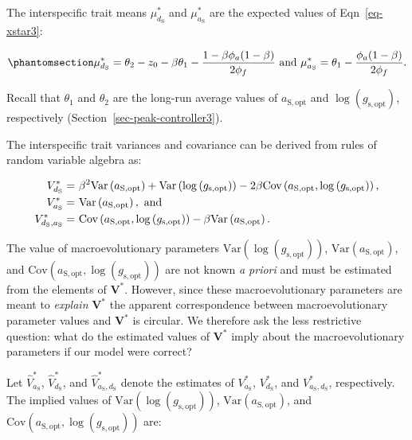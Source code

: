 \documentclass[
  letterpaper,
  DIV=11,
  numbers=noendperiod]{scrartcl}
\begin{document}
The interspecific trait means \(\mu_{d_{\mathrm{S}}}^*\) and
\(\mu_{a_{\mathrm{S}}}^*\) are the expected values of
Eqn~\ref{eq-xstar3}:

\begin{equation}\phantomsection\label{eq-mustar3}{\mu_{d_\mathrm{S}}^* = \theta_2 - z_0 - \beta \theta_1 - \frac{1 - \beta \phi_a (1 - \beta)}{2 \phi_f} ~\text{and}~\mu_{a_\mathrm{S}}^* = \theta_1 - \frac{\phi_a ( 1 - \beta)}{2 \phi_f}.}\end{equation}

Recall that \(\theta_1\) and \(\theta_2\) are the long-run average
values of \(a_\mathrm{S,opt}\) and
\(\log \left( g_\mathrm{s,opt} \right)\), respectively
(Section~\ref{sec-peak-controller3}).

The interspecific trait variances and covariance can be derived from
rules of random variable algebra as:

\begin{align}
\label{eq:Vstar3}
  V_{d_\mathrm{S}}^* =~& \beta ^2 \text{Var} \left( a_\mathrm{S,opt} \right) + \text{Var} \left(\log \left( g_\mathrm{s,opt} \right) \right) - 2 \beta \text{Cov} \left(a_\mathrm{S,opt}, \log \left(g_\mathrm{s,opt} \right) \right), \notag \\
  V_{a_\mathrm{S}}^* =~& \text{Var} \left( a_\mathrm{S,opt} \right),~\text{and} \notag \\
  V_{d_\mathrm{S},a_\mathrm{S}}^* =~& \text{Cov} \left(a_\mathrm{S,opt}, \log \left(g_\mathrm{s,opt} \right) \right) - \beta \text{Var} \left( a_\mathrm{S,opt} \right).
\end{align}

The value of macroevolutionary parameters
\(\text{Var} \left(\log \left( g_\mathrm{s,opt} \right) \right)\),
\(\text{Var} \left( a_\mathrm{S,opt} \right)\), and
\(\text{Cov} \left(a_\mathrm{S,opt},\log \left( g_\mathrm{s,opt} \right) \right)\)
are not known \emph{a priori} and must be estimated from the elements of
\(\mathbf{V}^*\). However, since these macroevolutionary parameters are
meant to \emph{explain} \(\mathbf{V}^*\) the apparent correspondence
between macroevolutionary parameter values and \(\mathbf{V}^*\) is
circular. We therefore ask the less restrictive question: what do the
estimated values of \(\mathbf{V}^*\) imply about the macroevolutionary
parameters if our model were correct?

Let \(\hat{V}_{a_\mathrm{S}}^*\), \(\hat{V}_{d_\mathrm{S}}^*\), and
\(\hat{V}_{a_\mathrm{S},d_\mathrm{S}}^*\) denote the estimates of
\(V_{a_\mathrm{S}}^*\), \(V_{d_\mathrm{S}}^*\), and
\(V_{a_\mathrm{S},d_\mathrm{S}}^*\), respectively. The implied values of
\(\text{Var} \left(\log \left( g_\mathrm{s,opt} \right) \right)\),
\(\text{Var} \left( a_\mathrm{S,opt} \right)\), and
\(\text{Cov} \left(a_\mathrm{S,opt},\log \left( g_\mathrm{s,opt} \right) \right)\)
are:
\end{document}
